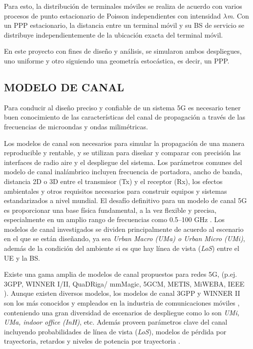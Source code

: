 Para esto, la distribución de terminales móviles se realiza de acuerdo con varios procesos de punto estacionario de Poisson independientes con intensidad \textit{$\lambda$m}. Con un PPP estacionario, la distancia entre un terminal móvil y su BS de servicio se distribuye independientemente de la ubicación exacta del terminal móvil.\newline

En este proyecto con fines de diseño y análisis, se simularon ambos despliegues, uno uniforme y otro siguiendo una geometría estocástica, es decir, un PPP.\newline

\subsection{MODELO DE CANAL}

Para conducir al diseño preciso y confiable de un sistema 5G es necesario tener buen conocimiento de las características del canal de propagación a través de las frecuencias de microondas y ondas milimétricas. \newline

Los modelos de canal son necesarios para simular la propagación de una manera reproducible y rentable, y se utilizan para diseñar y comparar con precisión las interfaces de radio aire y el despliegue del sistema. Los parámetros comunes del modelo de canal inalámbrico incluyen frecuencia de portadora, ancho de banda, distancia 2D o 3D entre el transmisor (Tx) y el receptor (Rx), los efectos ambientales y otros requisitos necesarios para construir equipos y sistemas estandarizados a nivel mundial. El desafío definitivo para un modelo de canal 5G es proporcionar una base física fundamental, a la vez flexible y precisa, especialmente en un amplio rango de frecuencias como 0.5--100 GHz \parencite{Rappaport2017}. Los modelos de canal investigados se dividen principalmente de acuerdo al escenario en el que se están diseñando, ya sea \textit{Urban Macro (UMa) o Urban Micro (UMi)}, además de la condición del ambiente si es que hay línea de vista (\textit{LoS}) entre el UE y la BS.\newline

Existe una gama amplia de modelos de canal propuestos para redes 5G, (p.ej. 3GPP, WINNER I/II, QuaDRiga/ mmMagic, 5GCM, METIS, MiWEBA, IEEE \parencite{WirelessSim}). Aunque existen diversos modelos, los modelos de canal 3GPP y WINNER II son los más conocidos y empleados en la industria de comunicaciones móviles \parencite{Sun2016}, conteniendo una gran diversidad de escenarios de despliegue como lo son \textit{UMi, UMa, indoor office (InH)}, etc. Además proveen parámetros clave del canal incluyendo probabilidades de línea de vista (\textit{LoS}), modelos de pérdida por trayectoria, retardos y niveles de potencia por trayectoria \parencite{Sun2016}. \newline

